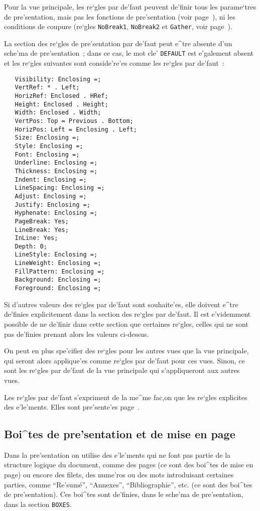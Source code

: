 {Pour la vue principale, les re`gles par de'faut peuvent de'finir tous les
parame`tres de pre'sentation, mais pas les fonctions de pre'sentation (voir
page~\pageref{fonctpres}), ni les conditions de coupure (re`gles
{\tt NoBreak1}, {\tt NoBreak2} et {\tt Gather}, voir
page~\pageref{condcoupure}).

La section des re`gles de pre'sentation par de'faut peut e^tre absente d'un
sche'ma de pre'sentation~; dans ce cas, le mot cle' {\tt DEFAULT} est
e'galement absent et les re`gles suivantes sont conside're'es comme les
re`gles par de'faut~:

\begin{verbatim}
   Visibility: Enclosing =;
   VertRef: * . Left;
   HorizRef: Enclosed . HRef;
   Height: Enclosed . Height;
   Width: Enclosed . Width;
   VertPos: Top = Previous . Bottom;
   HorizPos: Left = Enclosing . Left;
   Size: Enclosing =;
   Style: Enclosing =;
   Font: Enclosing =;
   Underline: Enclosing =;
   Thickness: Enclosing =;
   Indent: Enclosing =;
   LineSpacing: Enclosing =;
   Adjust: Enclosing =;
   Justify: Enclosing =;
   Hyphenate: Enclosing =;
   PageBreak: Yes;
   LineBreak: Yes;
   InLine: Yes;
   Depth: 0;
   LineStyle: Enclosing =;
   LineWeight: Enclosing =;
   FillPattern: Enclosing =;
   Background: Enclosing =;
   Foreground: Enclosing =;
\end{verbatim}

Si d'autres valeurs des re`gles par de'faut sont souhaite'es, elle doivent
e^tre de'finies explicitement dans la section des re`gles par de'faut. Il est
e'videmment possible de ne de'finir dans cette section que certaines re`gles,
celles qui ne sont pas de'finies prenant alors les valeurs ci-dessus.

On peut en plus spe'cifier des re`gles pour les autres vues que la vue
principale, qui seront alors applique'es comme re`gles par de'faut pour ces
vues. Sinon, ce sont les re`gles par de'faut de la vue principale qui
s'appliqueront aux autres vues.

Les re`gles par de'faut s'expriment de la me^me fac,on que les re`gles
explicites des e'le'ments. Elles sont pre'sente'es page~\pageref{reglepres}.

\subsection{Boi^tes de pre'sentation et de mise en page}

Dans la pre'sentation on utilise des e'le'ments qui ne font pas partie de la
structure logique du document, comme des pages (ce sont des
boi^tes de mise en page) ou encore des filets, des nume'ros ou des mots
introduisant certaines parties, comme ``Re'sum\'{e}'', ``Annexes'',
``Bibliographie'', etc. (ce sont des boi^tes de pre'sentation). Ces boi^tes
sont de'finies, dans le sche'ma de pre'sentation, dans la section {\tt BOXES}.

}
